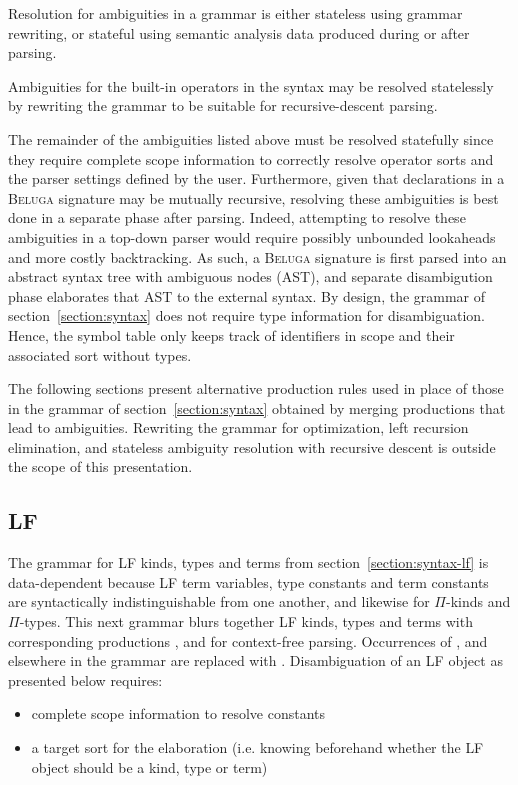 \documentclass[11pt]{article}
\newcommand{\Beluga}{\textsc{Beluga}\xspace}
\newcommand{\LF}{\textsc{LF}\xspace}
\begin{document}
Resolution for ambiguities in a grammar is either stateless using grammar rewriting, or stateful using semantic analysis data produced during or after parsing.

Ambiguities for the built-in operators in the syntax may be resolved statelessly by rewriting the grammar to be suitable for recursive-descent parsing.

The remainder of the ambiguities listed above must be resolved statefully since they require complete scope information to correctly resolve operator sorts and the parser settings defined by the user.
Furthermore, given that declarations in a \Beluga signature may be mutually recursive, resolving these ambiguities is best done in a separate phase after parsing.
Indeed, attempting to resolve these ambiguities in a top-down parser would require possibly unbounded lookaheads and more costly backtracking.
As such, a \Beluga signature is first parsed into an abstract syntax tree with ambiguous nodes (AST), and separate disambigution phase elaborates that AST to the external syntax.
By design, the grammar of section~\ref{section:syntax} does not require type information for disambiguation.
Hence, the symbol table only keeps track of identifiers in scope and their associated sort without types.

The following sections present alternative production rules used in place of those in the grammar of section~\ref{section:syntax} obtained by merging productions that lead to ambiguities.
Rewriting the grammar for optimization, left recursion elimination, and stateless ambiguity resolution with recursive descent is outside the scope of this presentation.

\subsection{\LF}

The grammar for \LF kinds, types and terms from section~\ref{section:syntax-lf} is data-dependent because \LF term variables, type constants and term constants are syntactically indistinguishable from one another, and likewise for $ \Pi $-kinds and $ \Pi $-types.
This next grammar blurs together \LF kinds, types and terms with corresponding productions ,  and  for context-free parsing.
Occurrences of ,  and  elsewhere in the grammar are replaced with .
Disambiguation of an \LF object as presented below requires:
\begin{itemize}
\item complete scope information to resolve constants
\item a target sort for the elaboration (i.e. knowing beforehand whether the \LF object should be a kind, type or term)
\end{itemize}
\end{document}
